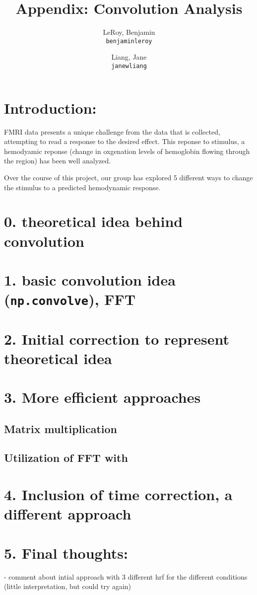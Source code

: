 \documentclass[11pt]{article}
\title{Appendix: Convolution Analysis}
\author{
  LeRoy, Benjamin\\
  \texttt{benjaminleroy}
  \and
  Liang, Jane\\
  \texttt{janewliang}
}
\begin{document}
\maketitle



\section{Introduction:}

FMRI data presents a unique challenge from the data that is collected, attempting to read a response to the desired effect. This reponse to stimulus, a hemodyamic reponse (change in oxgenation levels of hemoglobin flowing through the region) has been well analyzed.

Over the course of this project, our group has explored 5 different ways to change the stimulus to a predicted hemodynamic response.

\section{0. theoretical idea behind convolution}
\section{1. basic convolution idea (\texttt{np.convolve}), FFT}

\section{2. Initial correction to represent theoretical idea}

\section{3. More efficient approaches}

\subsection{Matrix multiplication}

\subsection{Utilization of FFT with }

\section{4. Inclusion of time correction, a different approach}

\section{5. Final thoughts:}
 - comment about intial approach with 3 different hrf for the different conditions (little interpretation, but could try again)





\end{document}
